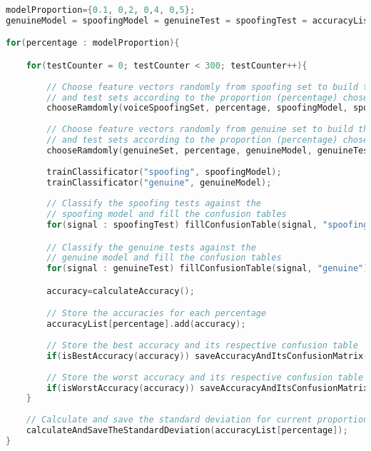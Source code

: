 \begin{lstlisting}[language=C++, caption={Procedure 3 algorithm}, label={lst:experiment03Algo}]
modelProportion={0.1, 0,2, 0,4, 0,5};
genuineModel = spoofingModel = genuineTest = spoofingTest = accuracyList = {};

for(percentage : modelProportion){

	for(testCounter = 0; testCounter < 300; testCounter++){
	
		// Choose feature vectors randomly from spoofing set to build the model
		// and test sets according to the proportion (percentage) chosen
		chooseRamdomly(voiceSpoofingSet, percentage, spoofingModel, spoofingTest);
		
		// Choose feature vectors randomly from genuine set to build the model
		// and test sets according to the proportion (percentage) chosen
		chooseRamdomly(genuineSet, percentage, genuineModel, genuineTest);
		
		trainClassificator("spoofing", spoofingModel);
		trainClassificator("genuine", genuineModel);
		
		// Classify the spoofing tests against the 
		// spoofing model and fill the confusion tables
		for(signal : spoofingTest) fillConfusionTable(signal, "spoofing"); 

		// Classify the genuine tests against the
		// genuine model and fill the confusion tables
		for(signal : genuineTest) fillConfusionTable(signal, "genuine");

		accuracy=calculateAccuracy();

		// Store the accuracies for each percentage
		accuracyList[percentage].add(accuracy);
		
		// Store the best accuracy and its respective confusion table
		if(isBestAccuracy(accuracy)) saveAccuracyAndItsConfusionMatrix();
		
		// Store the worst accuracy and its respective confusion table
		if(isWorstAccuracy(accuracy)) saveAccuracyAndItsConfusionMatrix();
	}
	
	// Calculate and save the standard deviation for current proportion
	calculateAndSaveTheStandardDeviation(accuracyList[percentage]);
}			
\end{lstlisting}